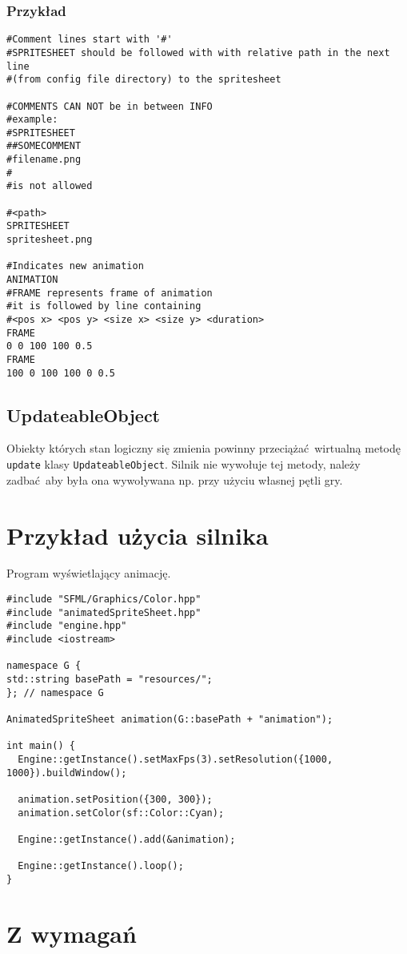 \documentclass[11pt]{article}
\begin{document}
\subsubsection{Przykład}
\label{sec:orgea87266}
\begin{verbatim}
#Comment lines start with '#'
#SPRITESHEET should be followed with with relative path in the next line
#(from config file directory) to the spritesheet

#COMMENTS CAN NOT be in between INFO
#example:
#SPRITESHEET
##SOMECOMMENT
#filename.png
#
#is not allowed

#<path>
SPRITESHEET
spritesheet.png

#Indicates new animation
ANIMATION
#FRAME represents frame of animation
#it is followed by line containing
#<pos x> <pos y> <size x> <size y> <duration>
FRAME
0 0 100 100 0.5
FRAME
100 0 100 100 0 0.5
\end{verbatim}
\subsection{UpdateableObject}
\label{sec:orgef1bc6b}
Obiekty których stan logiczny się zmienia powinny przeciążać wirtualną metodę \texttt{update} klasy \texttt{UpdateableObject}.
Silnik nie wywołuje tej metody, należy zadbać aby była ona wywoływana np. przy użyciu własnej pętli gry.
\section{Przykład użycia silnika}
\label{sec:org5077af7}
Program wyświetlający animację.

\begin{verbatim}
#include "SFML/Graphics/Color.hpp"
#include "animatedSpriteSheet.hpp"
#include "engine.hpp"
#include <iostream>

namespace G {
std::string basePath = "resources/";
}; // namespace G

AnimatedSpriteSheet animation(G::basePath + "animation");

int main() {
  Engine::getInstance().setMaxFps(3).setResolution({1000, 1000}).buildWindow();

  animation.setPosition({300, 300});
  animation.setColor(sf::Color::Cyan);

  Engine::getInstance().add(&animation);

  Engine::getInstance().loop();
}
\end{verbatim}
\section{Z wymagań}
\label{sec:orgac22fe5}
\end{document}
